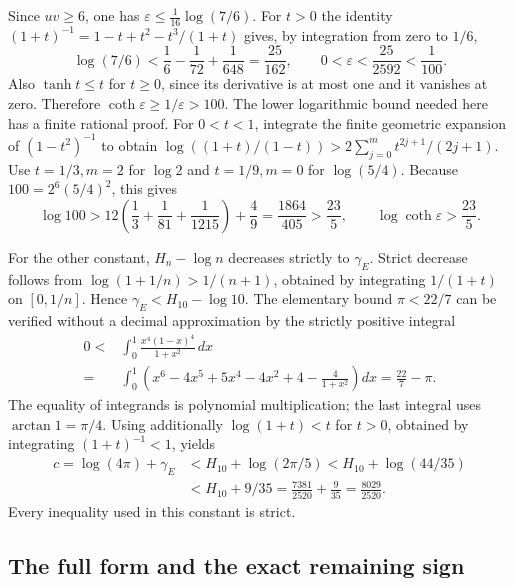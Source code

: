 \documentclass[11pt]{article}
\begin{document}
Since $uv\ge6$, one has
$\varepsilon\le\tfrac1{16}\log(7/6)$.
For $t>0$ the identity
$(1+t)^{-1}=1-t+t^2-t^3/(1+t)$ gives, by integration from
zero to $1/6$,
\[
 \log(7/6)<\frac16-\frac1{72}+\frac1{648}
             =\frac{25}{162},\qquad
 0<\varepsilon<\frac{25}{2592}<\frac1{100}.
 \tag{FWP18}
\]
Also $\tanh t\le t$ for $t\ge0$, since its derivative is at
most one and it vanishes at zero. Therefore
$\coth\varepsilon\ge1/\varepsilon>100$.
The lower logarithmic bound needed here has a finite rational proof.
For $0<t<1$, integrate the finite geometric expansion of
$(1-t^2)^{-1}$ to obtain
$\log((1+t)/(1-t))>2\sum_{j=0}^m t^{2j+1}/(2j+1)$.
Use $t=1/3,m=2$ for $\log2$ and $t=1/9,m=0$ for
$\log(5/4)$. Because $100=2^6(5/4)^2$, this gives
\[
 \log100>12\left(\frac13+\frac1{81}+\frac1{1215}\right)
                  +\frac49
             =\frac{1864}{405}>\frac{23}{5},
 \qquad \log\coth\varepsilon>\frac{23}{5}.
 \tag{FWP19}
\]

For the other constant, $H_n-\log n$ decreases strictly to
$\gamma_E$. Strict decrease follows from
$\log(1+1/n)>1/(n+1)$, obtained by integrating $1/(1+t)$ on
$[0,1/n]$. Hence $\gamma_E<H_{10}-\log10$.
The elementary bound $\pi<22/7$ can be verified without a decimal
approximation by the strictly positive integral
\[
\begin{split}
 0<&\int_0^1\frac{x^4(1-x)^4}{1+x^2}\,dx\\
  =&\int_0^1\left(x^6-4x^5+5x^4-4x^2+4
                                      -\frac4{1+x^2}\right)dx
    =\frac{22}{7}-\pi.
\end{split}
\tag{FWP20}
\]
The equality of integrands is polynomial multiplication; the last
integral uses $\arctan1=\pi/4$. Using additionally
$\log(1+t)<t$ for $t>0$, obtained by integrating
$(1+t)^{-1}<1$, yields
\[
\begin{split}
 c=\log(4\pi)+\gamma_E
 &<H_{10}+\log(2\pi/5)
 <H_{10}+\log(44/35)\\
 &<H_{10}+9/35
 =\frac{7381}{2520}+\frac9{35}
 =\frac{8029}{2520}.
\end{split}
\tag{FWP21}
\]
Every inequality used in this constant is strict.

\subsection{The full form and the exact remaining sign}
\end{document}
